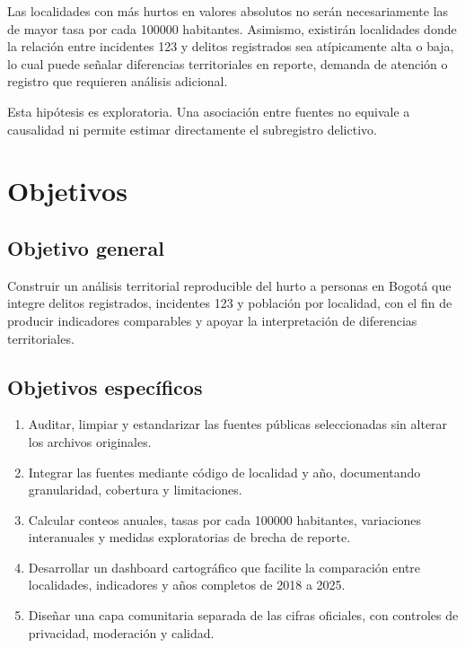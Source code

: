 \documentclass[11pt,letterpaper,oneside]{report}
\begin{document}
Las localidades con más hurtos en valores absolutos no serán necesariamente las de mayor tasa por cada \num{100000} habitantes. Asimismo, existirán localidades donde la relación entre incidentes 123 y delitos registrados sea atípicamente alta o baja, lo cual puede señalar diferencias territoriales en reporte, demanda de atención o registro que requieren análisis adicional.

Esta hipótesis es exploratoria. Una asociación entre fuentes no equivale a causalidad ni permite estimar directamente el subregistro delictivo.

\section{Objetivos}

\subsection{Objetivo general}

Construir un análisis territorial reproducible del hurto a personas en Bogotá que integre delitos registrados, incidentes 123 y población por localidad, con el fin de producir indicadores comparables y apoyar la interpretación de diferencias territoriales.

\subsection{Objetivos específicos}

\begin{enumerate}
  \item Auditar, limpiar y estandarizar las fuentes públicas seleccionadas sin alterar los archivos originales.
  \item Integrar las fuentes mediante código de localidad y año, documentando granularidad, cobertura y limitaciones.
  \item Calcular conteos anuales, tasas por cada \num{100000} habitantes, variaciones interanuales y medidas exploratorias de brecha de reporte.
  \item Desarrollar un dashboard cartográfico que facilite la comparación entre localidades, indicadores y años completos de 2018 a 2025.
  \item Diseñar una capa comunitaria separada de las cifras oficiales, con controles de privacidad, moderación y calidad.
\end{enumerate}

\end{document}
